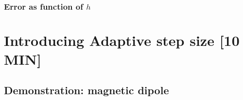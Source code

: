 \documentclass{beamer}
\begin{document}
\begin{frame}
\frametitle{Error as function of $h$}
%
\end{frame}

\section{Introducing Adaptive step size [10 MIN]}

\subsection{Demonstration: magnetic dipole}
\end{document}
